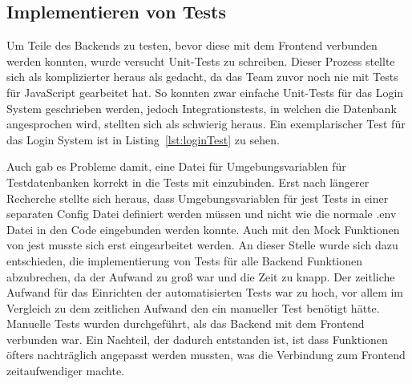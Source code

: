 \subsection{Implementieren von Tests}\label{subsec:implementieren-von-tests}

Um Teile des Backends zu testen, bevor diese mit dem Frontend verbunden werden konnten, wurde versucht Unit-Tests zu schreiben.
Dieser Prozess stellte sich als komplizierter heraus als gedacht, da das Team zuvor noch nie mit Tests für JavaScript gearbeitet hat.
So konnten zwar einfache Unit-Tests für das Login System geschrieben werden, jedoch Integrationstests, in welchen die Datenbank angesprochen wird, stellten sich als schwierig heraus.
Ein exemplarischer Test für das Login System ist in Listing~\ref{lst:loginTest} zu sehen.

\vspace{1em}

\vspace{1em}

Auch gab es Probleme damit, eine Datei für Umgebungsvariablen für Testdatenbanken korrekt in die Tests mit einzubinden.
Erst nach längerer Recherche stellte sich heraus, dass Umgebungsvariablen für jest Tests in einer separaten Config Datei definiert werden müssen und nicht wie die normale .env Datei in den Code eingebunden werden konnte.
Auch mit den Mock Funktionen von jest musste sich erst eingearbeitet werden.
An dieser Stelle wurde sich dazu entschieden, die implementierung von Tests für alle Backend Funktionen abzubrechen, da der Aufwand zu groß war und die Zeit zu knapp.
Der zeitliche Aufwand für das Einrichten der automatisierten Tests war zu hoch, vor allem im Vergleich zu dem zeitlichen Aufwand den ein manueller Test benötigt hätte.
Manuelle Tests wurden durchgeführt, als das Backend mit dem Frontend verbunden war.
Ein Nachteil, der dadurch entstanden ist, ist dass Funktionen öfters nachträglich angepasst werden mussten, was die Verbindung zum Frontend zeitaufwendiger machte.
